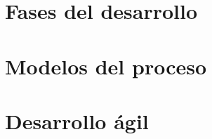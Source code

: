 \minitoc
    \section{Fases del desarrollo}\label{sec:fases-del-desarrollo}
    

    \section{Modelos del proceso}\label{sec:modelos-del-proceso}
    

    \section{Desarrollo ágil}\label{sec:desarrollo-agil}
    

